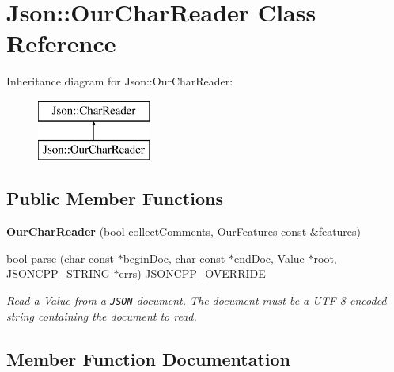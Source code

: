 \hypertarget{classJson_1_1OurCharReader}{}\section{Json\+:\+:Our\+Char\+Reader Class Reference}
\label{classJson_1_1OurCharReader}
Inheritance diagram for Json\+:\+:Our\+Char\+Reader\+:\begin{figure}[H]
\begin{center}
\leavevmode
\includegraphics[height=2.000000cm]{classJson_1_1OurCharReader}
\end{center}
\end{figure}
\subsection*{Public Member Functions}
\begin{DoxyCompactItemize}
\item 
{\bfseries Our\+Char\+Reader} (bool collect\+Comments, \hyperlink{classJson_1_1OurFeatures}{Our\+Features} const \&features)\hypertarget{classJson_1_1OurCharReader_a5015506620e7ba7bab417756fa1ca9fe}{}\label{classJson_1_1OurCharReader_a5015506620e7ba7bab417756fa1ca9fe}

\item 
bool \hyperlink{classJson_1_1OurCharReader_a547f08ec5a9951ca69e8bb2e90296c83}{parse} (char const $\ast$begin\+Doc, char const $\ast$end\+Doc, \hyperlink{classJson_1_1Value}{Value} $\ast$root, J\+S\+O\+N\+C\+P\+P\+\_\+\+S\+T\+R\+I\+NG $\ast$errs) J\+S\+O\+N\+C\+P\+P\+\_\+\+O\+V\+E\+R\+R\+I\+DE
\begin{DoxyCompactList}\small\item\em Read a \hyperlink{classJson_1_1Value}{Value} from a \href{http://www.json.org}{\tt J\+S\+ON} document. The document must be a U\+T\+F-\/8 encoded string containing the document to read. \end{DoxyCompactList}\end{DoxyCompactItemize}


\subsection{Member Function Documentation}
